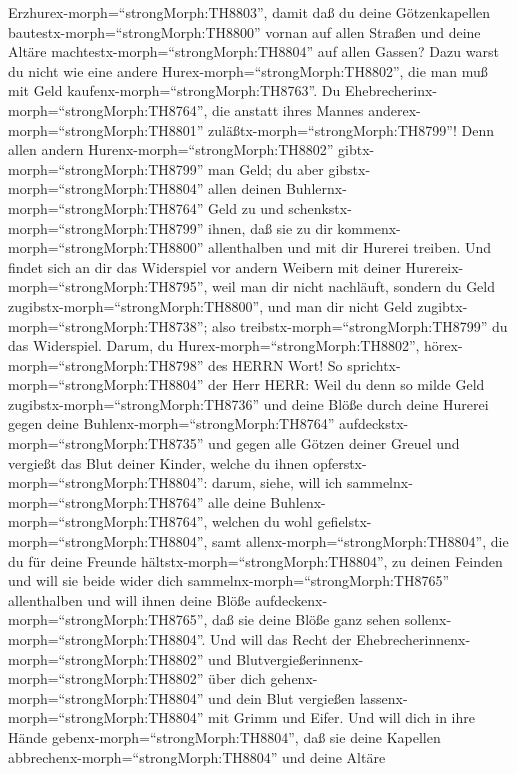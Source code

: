 Erzhurex-morph=``strongMorph:TH8803'',  damit daß du deine
Götzenkapellen bautestx-morph=``strongMorph:TH8800'' vornan auf allen
Straßen und deine Altäre machtestx-morph=``strongMorph:TH8804'' auf
allen Gassen? Dazu warst du nicht wie eine andere
Hurex-morph=``strongMorph:TH8802'', die man muß mit Geld
kaufenx-morph=``strongMorph:TH8763''.  Du
Ehebrecherinx-morph=``strongMorph:TH8764'', die anstatt ihres Mannes
anderex-morph=``strongMorph:TH8801''
zuläßtx-morph=``strongMorph:TH8799''!  Denn allen andern
Hurenx-morph=``strongMorph:TH8802'' gibtx-morph=``strongMorph:TH8799''
man Geld; du aber gibstx-morph=``strongMorph:TH8804'' allen deinen
Buhlernx-morph=``strongMorph:TH8764'' Geld zu und
schenkstx-morph=``strongMorph:TH8799'' ihnen, daß sie zu dir
kommenx-morph=``strongMorph:TH8800'' allenthalben und mit dir Hurerei
treiben.  Und findet sich an dir das Widerspiel vor andern
Weibern mit deiner Hurereix-morph=``strongMorph:TH8795'', weil man dir
nicht nachläuft, sondern du Geld zugibstx-morph=``strongMorph:TH8800'',
und man dir nicht Geld zugibtx-morph=``strongMorph:TH8738''; also
treibstx-morph=``strongMorph:TH8799'' du das Widerspiel. 
Darum, du Hurex-morph=``strongMorph:TH8802'',
hörex-morph=``strongMorph:TH8798'' des HERRN Wort!  So
sprichtx-morph=``strongMorph:TH8804'' der Herr HERR: Weil du denn so
milde Geld zugibstx-morph=``strongMorph:TH8736'' und deine Blöße durch
deine Hurerei gegen deine Buhlenx-morph=``strongMorph:TH8764''
aufdeckstx-morph=``strongMorph:TH8735'' und gegen alle Götzen deiner
Greuel und vergießt das Blut deiner Kinder, welche du ihnen
opferstx-morph=``strongMorph:TH8804'':  darum, siehe, will
ich sammelnx-morph=``strongMorph:TH8764'' alle deine
Buhlenx-morph=``strongMorph:TH8764'', welchen du wohl
gefielstx-morph=``strongMorph:TH8804'', samt
allenx-morph=``strongMorph:TH8804'', die du für deine Freunde
hältstx-morph=``strongMorph:TH8804'', zu deinen Feinden und will sie
beide wider dich sammelnx-morph=``strongMorph:TH8765'' allenthalben und
will ihnen deine Blöße aufdeckenx-morph=``strongMorph:TH8765'', daß sie
deine Blöße ganz sehen sollenx-morph=``strongMorph:TH8804''.
 Und will das Recht der
Ehebrecherinnenx-morph=``strongMorph:TH8802'' und
Blutvergießerinnenx-morph=``strongMorph:TH8802'' über dich
gehenx-morph=``strongMorph:TH8804'' und dein Blut vergießen
lassenx-morph=``strongMorph:TH8804'' mit Grimm und Eifer. 
Und will dich in ihre Hände gebenx-morph=``strongMorph:TH8804'', daß sie
deine Kapellen abbrechenx-morph=``strongMorph:TH8804'' und deine Altäre
